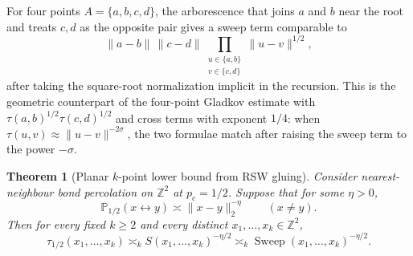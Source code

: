 \documentclass[11pt,reqno]{book}
\numberwithin{equation}{chapter}
\theoremstyle{plain}
\newtheorem{theorem}{Theorem}[chapter]
\theoremstyle{definition}
\theoremstyle{remark}
\renewcommand{\P}{\mathbb P}
\newcommand{\Z}{\mathbb Z}
\newcommand{\1}{\mathbf 1}
\newcommand{\norm}[1]{\lVert #1\rVert}
\begin{document}
For four points \(A=\{a,b,c,d\}\), the arborescence that joins \(a\) and
\(b\) near the root and treats \(c,d\) as the opposite pair gives a sweep
term comparable to
\[
  \norm{a-b}\,\norm{c-d}
  \prod_{\substack{u\in\{a,b\}\\ v\in\{c,d\}}}
  \norm{u-v}^{1/2},
\]
after taking the square-root normalization implicit in the recursion. This
is the geometric counterpart of the four-point Gladkov estimate with
\(\tau(a,b)^{1/2}\tau(c,d)^{1/2}\) and cross terms with exponent \(1/4\):
when \(\tau(u,v)\approx \norm{u-v}^{-2\sigma}\), the two formulae match after
raising the sweep term to the power \(-\sigma\).

\begin{theorem}[Planar \(k\)-point lower bound from RSW gluing]
\label{thm:planar-k-point-gluing}
Consider nearest-neighbour bond percolation on \(\Z^2\) at
\(p_c=1/2\). Suppose that for some \(\eta>0\),
\[
  \P_{1/2}(x\leftrightarrow y)\asymp \norm{x-y}_2^{-\eta}
  \qquad (x\neq y).
\]
Then for every fixed \(k\geq2\) and every distinct
\(x_1,\ldots,x_k\in\Z^2\),
\[
  \tau_{1/2}(x_1,\ldots,x_k)
  \asymp_k
  S(x_1,\ldots,x_k)^{-\eta/2}
  \asymp_k
  \operatorname{Sweep}(x_1,\ldots,x_k)^{-\eta/2}.
\]
\end{theorem}
\end{document}
